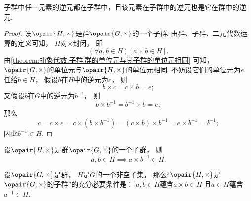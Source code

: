 \begin{proposition}
子群中任一元素的逆元都在子群中，且该元素在子群中的逆元也是它在群中的逆元.
\begin{proof}
设\(\opair{H,\times}\)是群\(\opair{G,\times}\)的一个子群.
由群、子群、二元代数运算的定义可知，
\(H\)对\(\times\)封闭，
即\begin{equation*}
	(\forall a,b \in H)[a \times b \in H].
\end{equation*}
由\cref{theorem:抽象代数.子群.群的单位元与其子群的单位元相同} 可知，
\(\opair{G,\times}\)的单位元与\(\opair{H,\times}\)的单位元相同.
不妨设它们的单位元为\(e\).
任给\(b \in H\)，
假设\(b\)在\(H\)中的逆元为\(c\)，
则\begin{equation*}
	b \times c = c \times b = e;
\end{equation*}
又假设\(b\)在\(G\)中的逆元为\(b^{-1}\)，
则\begin{equation*}
	b \times b^{-1} = b^{-1} \times b = e;
\end{equation*}
那么\begin{equation*}
	c = c \times e
	= c \times (b \times b^{-1})
	= (c \times b) \times b^{-1}
	= e \times b^{-1}
	= b^{-1};
\end{equation*}
因此\(b^{-1} \in H\).
\end{proof}
\end{proposition}

\begin{corollary}
设\(\opair{H,\times}\)是群\(\opair{G,\times}\)的一个子群，
则\begin{equation*}
	a,b \in H
	\implies
	a \times b^{-1} \in H.
\end{equation*}
\end{corollary}

\begin{theorem}
设\(\opair{G,\times}\)是群，
\(H\)是\(G\)的一个非空子集，
那么“\(\opair{H,\times}\)是\(\opair{G,\times}\)的子群”的充分必要条件是：
\(a,b \in H\)蕴含\(a \times b \in H\)
且\(a \in H\)蕴含\(a^{-1} \in H\).
\end{theorem}

